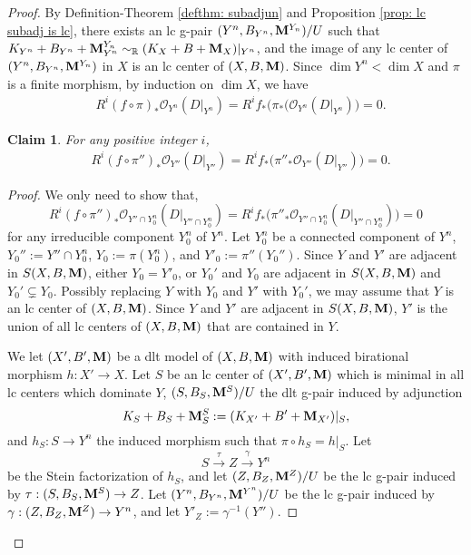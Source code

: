 \documentclass[11pt]{amsart}
\numberwithin{equation}{section}
\newcommand{\Mm}{{\bf{M}}}
\newtheorem{claim}[thm]{Claim}
\theoremstyle{definition}
\theoremstyle{definition}
\theoremstyle{definition}
\begin{document}
\begin{proof}
By Definition-Theorem \ref{defthm: subadjun} and Proposition \ref{prop: lc subadj is lc}, there exists an lc g-pair $(Y^n,B_{Y^n},\Mm^{Y_n})/U$ such that $K_{Y^n}+B_{Y^n}+\Mm^{Y_n}_{Y^n}\sim_{\mathbb R}(K_X+B+\Mm_X)|_{Y^n}$, and the image of any lc center of $(Y^n,B_{Y^n},\Mm^{Y_n})$ in $X$ is an lc center of $(X,B,\Mm)$. Since $\dim Y^n<\dim X$ and $\pi$ is a finite morphism, by induction on $\dim X$, we have
\begin{align}\label{eq3.2}
&R^i(f\circ \pi)_*\mathcal{O}_{Y^n}(D|_{Y^n})=R^if_*\big(\pi_*(\mathcal{O}_{Y^n}(D|_{Y^n})\big)
=0.
\end{align}
\begin{claim}
    For any positive integer $i$,
    \begin{align}\label{eq3.3}
&R^i(f\circ \pi'')_*\mathcal{O}_{Y''}(D|_{Y''})= R^if_*\big(\pi''_*\mathcal{O}_{Y''}(D|_{Y''})\big)=0.
\end{align}
\end{claim}
\begin{proof}
    We only need to show that,
    $$R^i(f\circ \pi'')_*\mathcal{O}_{Y''\cap Y^n_0}(D|_{Y''\cap Y^n_0})= R^if_*\big(\pi''_*\mathcal{O}_{Y''\cap Y^n_0}(D|_{Y''\cap Y^n_0})\big)=0$$
for any irreducible component $Y^n_0$ of $Y^n$. Let $Y^n_0$ be a connected component of $Y^n$, $Y_0'':=Y''\cap Y^n_0$, $Y_0:=\pi(Y^n_0)$, and $Y'_0:=\pi''(Y_0'')$. Since $Y$ and $Y'$ are adjacent in $S(X,B,\Mm)$, either $Y_0=Y'_0$, or $Y_0'$ and $Y_0$ are adjacent in $S(X,B,\Mm)$ and $Y_0'\subsetneq Y_0$. Possibly replacing $Y$ with $Y_0$ and $Y'$ with $Y_0'$, we may assume that $Y$ is an lc center of $(X,B,\Mm)$. Since  $Y$ and $Y'$ are adjacent in $S(X,B,\Mm)$, $Y'$ is the union of all lc centers of $(X,B,\Mm)$ that are contained in $Y$.
    
We let $(X',B',\Mm)$ be a dlt model of $(X,B,\Mm)$ with induced birational morphism $h: X'\rightarrow X$. Let $S$ be an lc center of $(X',B',\Mm)$ which is minimal in all lc centers which dominate $Y$, $(S,B_S,\Mm^S)/U$ the dlt g-pair induced by adjunction 
$$K_S+B_S+\Mm^S_S:=(K_{X'}+B'+\Mm_{X'})|_S,$$
and $h_S: S\rightarrow Y^n$ the induced morphism such that $\pi\circ h_S=h|_S$. Let
$$S\xrightarrow{\tau} Z\xrightarrow{\gamma} Y^n$$
be the Stein factorization of $h_S$, and let $(Z,B_Z,\Mm^Z)/U$ be the lc g-pair induced by $\tau: (S,B_S,\Mm^S)\rightarrow Z$. Let $(Y^n,B_{Y^n},\Mm^{Y^n})/U$ be the lc g-pair induced by $\gamma: (Z,B_Z,\Mm^Z)\rightarrow Y^n$, and let $Y'_Z:=\gamma^{-1}(Y'')$.


\end{proof}
\end{proof}
\end{document}
